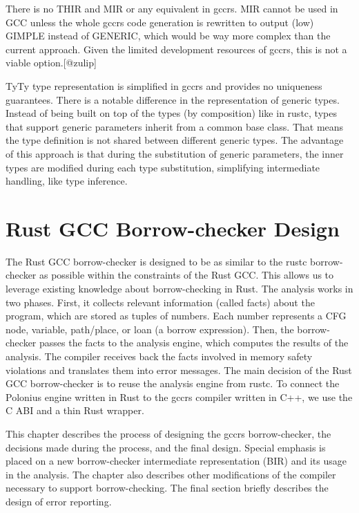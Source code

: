 \documentclass[
  11pt,
]{report}
\begin{document}
There is no THIR and MIR or any equivalent in gccrs. MIR cannot be used
in GCC unless the whole gccrs code generation is rewritten to output
(low) GIMPLE instead of GENERIC, which would be way more complex than
the current approach. Given the limited development resources of gccrs,
this is not a viable option.{[}@zulip{]}

TyTy type representation is simplified in gccrs and provides no
uniqueness guarantees. There is a notable difference in the
representation of generic types. Instead of being built on top of the
types (by composition) like in rustc, types that support generic
parameters inherit from a common base class. That means the type
definition is not shared between different generic types. The advantage
of this approach is that during the substitution of generic parameters,
the inner types are modified during each type substitution, simplifying
intermediate handling, like type inference.

\chapter{Rust GCC Borrow-checker
Design}\label{rust-gcc-borrow-checker-design}

The Rust GCC borrow-checker is designed to be as similar to the rustc
borrow-checker as possible within the constraints of the Rust GCC. This
allows us to leverage existing knowledge about borrow-checking in Rust.
The analysis works in two phases. First, it collects relevant
information (called facts) about the program, which are stored as tuples
of numbers. Each number represents a CFG node, variable, path/place, or
loan (a borrow expression). Then, the borrow-checker passes the facts to
the analysis engine, which computes the results of the analysis. The
compiler receives back the facts involved in memory safety violations
and translates them into error messages. The main decision of the Rust
GCC borrow-checker is to reuse the analysis engine from rustc. To
connect the Polonius engine written in Rust to the gccrs compiler
written in C++, we use the C ABI and a thin Rust wrapper.

This chapter describes the process of designing the gccrs
borrow-checker, the decisions made during the process, and the final
design. Special emphasis is placed on a new borrow-checker intermediate
representation (BIR) and its usage in the analysis. The chapter also
describes other modifications of the compiler necessary to support
borrow-checking. The final section briefly describes the design of error
reporting.
\end{document}
